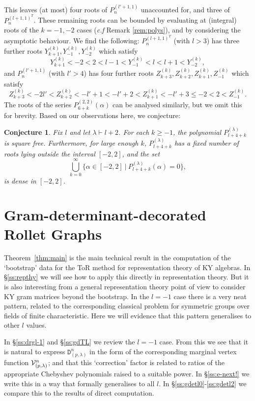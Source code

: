 \documentclass{article}
\newcommand{\ppmm}[1]{#1}  %
\newtheorem{conjecture}{Conjecture}[theorem]
\theoremstyle{definition}
\newcommand{\Deltt}{{\mathtt D}}   %
\newcommand{\Delttt}[2]{\Deltt^{#1}_{(#2)}}  %
\def\a{\alpha}
\def\l{\lambda}
\numberwithin{equation}{subsection}
\begin{document}
This leaves (at most) four roots of $P^{(l'+1,1)}_{n}$ unaccounted for, and three of $P^{(l+1,1)^T}_{n}$. These remaining roots can be bounded by evaluating at (integral) roots of the $k=-1,-2$ cases (\textit{c.f} Remark \ref{rem:polys}), and by considering the asymptotic behaviour. We find the following: $P^{(l+1,1)^T}_{n}$ (with $l>3$) has three further roots $Y_{k+1}^{(k)},Y_{-1}^{(k)},Y_{-2}^{(k)}$ which satisfy
\[Y_{k+1}^{(k)}<-2<2<l-1<Y_{-1}^{(k)}<l<l+1<Y_{-2}^{(k)},\]
and $P^{(l'+1,1)}_{n}$ (with $l'>4$) has four further roots $Z_{k+3}^{(k)},Z_{k+2}^{(k)},Z_{k+1}^{(k)},Z_{-1}^{(k)}$ which satisfy
\[Z_{k+3}^{(k)}<-2l'< Z_{k+2}^{(k)}<-l'+1<-l'+2<Z_{k+1}^{(k)}<-l'+3\leq -2<2<Z_{-1}^{(k)}.\]
The roots of the series $P^{(2,2)}_{6+k}(\a)$ can be analysed similarly, but we omit this for brevity. Based on our observations here, we conjecture:

\begin{conjecture} Fix $l$ and let $\l \vdash l+2$. For each $k\geq -1$, the polynomial $P^{(\l)}_{l+4+k}$ is square free. Furthermore, for large enough $k$, $P^{(\l)}_{l+4+k}$ has a fixed number of roots lying outside the interval $[-2,2]$, and the set
\[\bigcup_{k=0}^{\infty } \{\a \in [-2,2] \ | \ P^{(\l)}_{l+4+k}(\a)=0  \},\]
    is dense \ppmm{in $[-2,2]$}.
\end{conjecture}


\section{Gram-determinant-decorated Rollet Graphs}   \label{ss:gdetdecrollet}

Theorem~\ref{thm:main} is the main technical result in the computation of the `bootstrap' data 
for the ToR method for representation theory of KY algebras. 
In \S\ref{ss:repthy} we will see how to apply this directly in representation theory. 
But it is also interesting from a general representation theory point of view to consider KY gram matrices beyond the bootstrap. In the $l=-1$ case there is a very neat pattern, related to the corresponding classical problem for symmetric groups over fields of finite characteristic. 
Here we will evidence that this pattern generalises to other $l$ values. 

In \S\ref{ss:drgl-1} and \S\ref{ss:gdTL} we review the $l=-1$ case. 
From this we see that it is natural to express $\Delttt{n}{p,\l}$ in the form of the corresponding marginal vertex function $\V^n_{(p,\l)}$; and that this `correction' factor is related to ratios of the appropriate Chebyshev polynomials raised to a suitable power. 
In \S\ref{ss:e-next!} we  write this in a way that 
formally generalises to all $l$. 
In \S\ref{ss:gdetl0}-\ref{ss:gdetl2} we compare this to the results of direct computation. 
\end{document}
